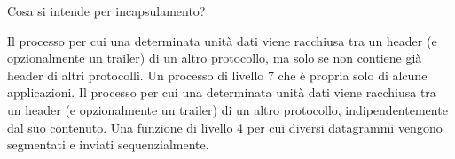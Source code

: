 \question
Cosa si intende per incapsulamento?

\begin{checkboxes}
	\choice Il processo per cui una determinata unità dati viene racchiusa tra un header (e opzionalmente un trailer) di un altro protocollo, ma solo se non contiene già header di altri protocolli.
	\choice Un processo di livello 7 che è propria solo di alcune applicazioni.
	\CorrectChoice Il processo per cui una determinata unità dati viene racchiusa tra un header (e opzionalmente un trailer) di un altro protocollo, indipendentemente dal suo contenuto.
	\choice Una funzione di livello 4 per cui diversi datagrammi vengono segmentati e inviati sequenzialmente.
\end{checkboxes}
